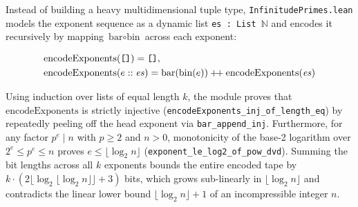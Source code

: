 \documentclass[acmsmall,natbib=false,nonacm]{acmart}
\begin{document}
Instead of building a heavy multidimensional tuple type, \texttt{InfinitudePrimes.lean} models the exponent sequence as a dynamic list \texttt{es : List $\mathbb{N}$} and encodes it recursively by mapping $\text{bar} \circ \text{bin}$ across each exponent:

\begin{equation}
  \centering
  \begin{aligned}
    &\text{encodeExponents}(\texttt{[]}) = \texttt{[]}, \\
    &\text{encodeExponents}(e :: \mathit{es}) = \text{bar}(\text{bin}(e)) \mathbin{+\!+} \text{encodeExponents}(\mathit{es})
  \end{aligned}
\end{equation}

Using induction over lists of equal length $k$, the module proves that $\text{encodeExponents}$ is strictly injective (\texttt{encodeExponents\_inj\_of\_length\_eq}) by repeatedly peeling off the head exponent via \texttt{bar\_append\_inj}. Furthermore, for any factor $p^e \mid n$ with $p \ge 2$ and $n > 0$, monotonicity of the base-2 logarithm over $2^e \le p^e \le n$ proves $e \le \lfloor\log_2 n\rfloor$ (\texttt{exponent\_le\_log2\_of\_pow\_dvd}). Summing the bit lengths across all $k$ exponents bounds the entire encoded tape by $k \cdot (2\lfloor\log_2\lfloor\log_2 n\rfloor\rfloor + 3)$ bits, which grows sub-linearly in $\lfloor\log_2 n\rfloor$ and contradicts the linear lower bound $\lfloor\log_2 n\rfloor + 1$ of an incompressible integer $n$.
\end{document}
